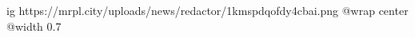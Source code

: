  
 
 
 
 

\ifcmt
  ig https://mrpl.city/uploads/news/redactor/1kmspdqofdy4cbai.png
  @wrap center
  @width 0.7
\fi
